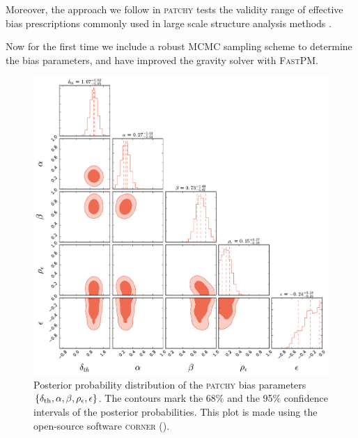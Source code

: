 \documentclass[english,usenatbib]{mn2e}
\begin{document}
Moreover, the approach we follow in \textsc{patchy} tests the validity range of effective bias prescriptions commonly used in large scale structure analysis methods \citep[see e.g.][]{ata2015}.

Now for the first time we include a robust MCMC sampling scheme to determine the bias parameters, and have improved the gravity solver with \textsc{FastPM}.

\begin{figure}
\includegraphics[width=2\columnwidth]{posterior}
\caption{\label{fig:bias} Posterior probability distribution of the \textsc{patchy} bias parameters $\{\delta_{\rm th},\alpha,\beta,\rho_{\epsilon},\epsilon\}$. The contours mark the 68$\%$ and the 95$\%$ confidence intervals of the posterior probabilities. This plot is made using the open-source software \textsc{corner} (\citealt{corner}).}
\end{figure}
\end{document}
